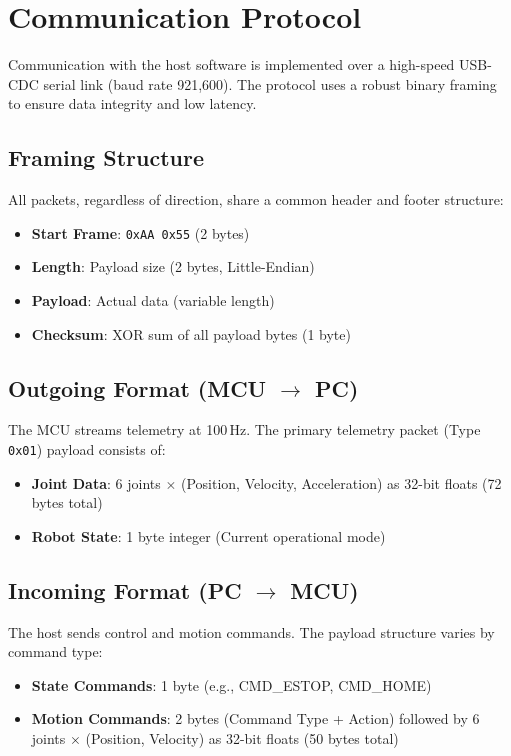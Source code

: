 \documentclass[12pt,a4paper]{report}
\begin{document}
\section{Communication Protocol}

Communication with the host software is implemented over a high-speed USB-CDC serial link (baud rate 921,600). The protocol uses a robust binary framing to ensure data integrity and low latency.

\subsection{Framing Structure}
All packets, regardless of direction, share a common header and footer structure:
\begin{itemize}
    \item \textbf{Start Frame}: \texttt{0xAA 0x55} (2 bytes)
    \item \textbf{Length}: Payload size (2 bytes, Little-Endian)
    \item \textbf{Payload}: Actual data (variable length)
    \item \textbf{Checksum}: XOR sum of all payload bytes (1 byte)
\end{itemize}

\subsection{Outgoing Format (MCU $\rightarrow$ PC)}
The MCU streams telemetry at 100\,Hz. The primary telemetry packet (Type \texttt{0x01}) payload consists of:
\begin{itemize}
    \item \textbf{Joint Data}: 6 joints $\times$ (Position, Velocity, Acceleration) as 32-bit floats (72 bytes total)
    \item \textbf{Robot State}: 1 byte integer (Current operational mode)
\end{itemize}

\subsection{Incoming Format (PC $\rightarrow$ MCU)}
The host sends control and motion commands. The payload structure varies by command type:
\begin{itemize}
    \item \textbf{State Commands}: 1 byte (e.g., CMD\_ESTOP, CMD\_HOME)
    \item \textbf{Motion Commands}: 2 bytes (Command Type + Action) followed by 6 joints $\times$ (Position, Velocity) as 32-bit floats (50 bytes total)
\end{itemize}
\end{document}
